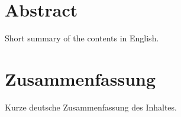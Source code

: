 \begingroup
\let\clearpage\relax
\let\cleardoublepage\relax
\let\cleardoublepage\relax

\chapter*{Abstract}
Short summary of the contents in English.

\vfill

\chapter*{Zusammenfassung}
Kurze deutsche Zusammenfassung des Inhaltes.

\endgroup			

\vfill